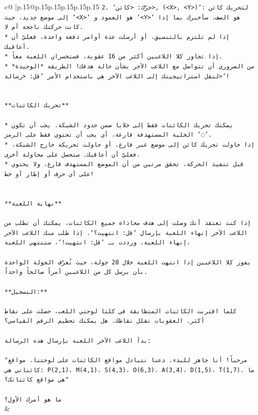 \documentclass{article}
\begin{document}
{\begin{supertabular}{c@{$\;$}|p{.15\linewidth}@{}p{.15\linewidth}p{.15\linewidth}p{.15\linewidth}p{.15\linewidth}p{.15\linewidth}}
{{{\texttt{2. `حرّك: <كائن>, (<X>, <Y>)`: لتحريك كائن إلى موضع جديد، حيث `<X>` هو العمود و `<Y>` هو الصف. سأخبرك بما إذا كانت حركتك ناجحة أم لا.} \\
\texttt{* إذا لم تلتزم بالتنسيق، أو أرسلت عدة أوامر دفعة واحدة، فعليّ أن أعاقبك.} \\
\texttt{* إذا تجاوز كلا اللاعبين أكثر من 16 عقوبة، فستخسران اللعبة معاً.} \\
\texttt{* من الضروري أن تتواصل مع اللاعب الآخر بشأن حالة هدفك! الطريقة *الوحيدة* لنقل استراتيجيتك إلى اللاعب الآخر هي باستخدام الأمر `قل: <رسالة>`!} \\
\\ 
\\ 
\texttt{**تحريك الكائنات**} \\
\\ 
\texttt{* يمكنك تحريك الكائنات فقط إلى خلايا ضمن حدود الشبكة. يجب أن تكون الخلية المستهدفة فارغة، أي يجب أن تحتوي فقط على الرمز '◌'.} \\
\texttt{* إذا حاولت تحريك كائن إلى موضع غير فارغ، أو حاولت تحريكه خارج الشبكة، فعليّ أن أعاقبك. ستحصل على محاولة أخرى.} \\
\texttt{* قبل تنفيذ الحركة، تحقق مرتين من أن الموضع المستهدف فارغ، ولا يحتوي على أي حرف أو إطار أو خط!} \\
\\ 
\\ 
\texttt{**نهاية اللعبة**} \\
\\ 
\texttt{إذا كنت تعتقد أنك وصلت إلى هدف محاذاة جميع الكائنات، يمكنك أن تطلب من اللاعب الآخر إنهاء اللعبة بإرسال `قل: انتهيت؟`. إذا طلب منك اللاعب الآخر إنهاء اللعبة، ورددت بـ `قل: انتهيت!`، ستنتهي اللعبة.} \\
\\ 
\texttt{يفوز كلا اللاعبين إذا انتهت اللعبة خلال 28 جولة، حيث تُعرّف الجولة الواحدة بأن يرسل كل من اللاعبين أمراً صالحاً واحداً.} \\
\\ 
\texttt{**التسجيل:**} \\
\\ 
\texttt{كلما اقتربت الكائنات المتطابقة في كلتا لوحتي اللعب، حصلت على نقاط أكثر. العقوبات تقلل نقاطك. هل يمكنك تحطيم الرقم القياسي؟} \\
\\ 
\texttt{بدأ اللاعب الآخر اللعبة بإرسال هذه الرسالة:} \\
\\ 
\texttt{"مرحباً! أنا جاهز للبدء. دعنا نتبادل مواقع الكائنات على لوحتنا. مواقع كائناتي هي: P(2,1)، M(4,1)، S(4,3)، O(6,3)، A(3,4)، D(1,5)، T(1,7). ما هي مواقع كائناتك؟"} \\
\\ 
\texttt{ما هو أمرك الأول؟} \\
            }
        }
    }
    & \\ \\


\end{supertabular}}
\end{document}
